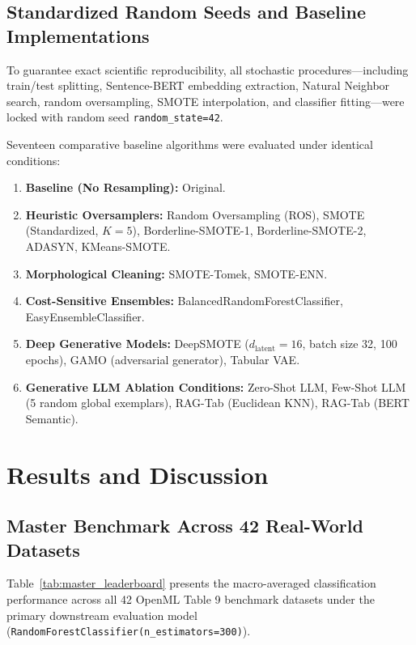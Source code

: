 \documentclass[sn-basic]{sn-jnl}
\begin{document}
\subsection{Standardized Random Seeds and Baseline Implementations}
To guarantee exact scientific reproducibility, all stochastic procedures---including train/test splitting, Sentence-BERT embedding extraction, Natural Neighbor search, random oversampling, SMOTE interpolation, and classifier fitting---were locked with random seed \texttt{random\_state=42}. 

Seventeen comparative baseline algorithms were evaluated under identical conditions:
\begin{enumerate}
    \item \textbf{Baseline (No Resampling):} Original.
    \item \textbf{Heuristic Oversamplers:} Random Oversampling (ROS), SMOTE (Standardized, $K=5$), Borderline-SMOTE-1, Borderline-SMOTE-2, ADASYN, KMeans-SMOTE.
    \item \textbf{Morphological Cleaning:} SMOTE-Tomek, SMOTE-ENN.
    \item \textbf{Cost-Sensitive Ensembles:} BalancedRandomForestClassifier, EasyEnsembleClassifier.
    \item \textbf{Deep Generative Models:} DeepSMOTE ($d_{\text{latent}}=16$, batch size 32, 100 epochs), GAMO (adversarial generator), Tabular VAE.
    \item \textbf{Generative LLM Ablation Conditions:} Zero-Shot LLM, Few-Shot LLM (5 random global exemplars), RAG-Tab (Euclidean KNN), RAG-Tab (BERT Semantic).
\end{enumerate}

\section{Results and Discussion}
\label{sec:results_discussion}

\subsection{Master Benchmark Across 42 Real-World Datasets}
\label{subsec:master_benchmark}
Table~\ref{tab:master_leaderboard} presents the macro-averaged classification performance across all 42 OpenML Table 9 benchmark datasets under the primary downstream evaluation model (\texttt{RandomForestClassifier(n\_estimators=300)}).
\end{document}
